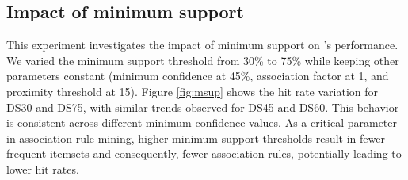 



    \subsection{Impact of minimum support}
        This experiment investigates the impact of minimum support on \spaarc's performance. We varied the minimum support threshold from 30\% to 75\% while keeping other parameters constant (minimum confidence at 45\%, association factor at 1, and proximity threshold at 15). Figure \ref{fig:msup} shows the hit rate variation for DS30 and DS75, with similar trends observed for DS45 and DS60. This behavior is consistent across different minimum confidence values. As a critical parameter in association rule mining, higher minimum support thresholds result in fewer frequent itemsets and consequently, fewer association rules, potentially leading to lower hit rates.


